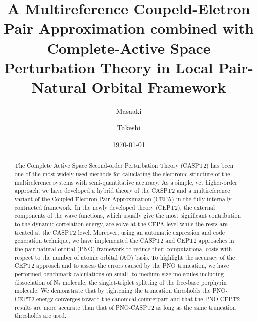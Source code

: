 \documentclass[aip,jcp,amsmath]{revtex4-1}
\begin{document}
\title{\color{blue}
  A Multireference Coupeld-Eletron Pair Approximation combined with Complete-Active Space Perturbation Theory in Local Pair-Natural Orbital Framework}
\date{\today}
\author{Masaaki }

\author{Takeshi }

\begin{abstract}  
  The Complete Active Space Second-order Perturbation Theory (CASPT2) has been one of the most widely used methods for caluclating the electronic structure of the multireference systems with semi-quantitative accuracy.
  As a simple, yet higher-order approach, we have developed a hybrid theory of the CASPT2 and a multireference variant of the Coupled-Electron Pair Approximation (CEPA) in the fully-internally contracted framework.
  In the newly developed theory (CEPT2), the external components of the wave functions, which usually give the most significant contribution to the dynamic correlation energy, are solve at the CEPA level while the rests are treated at the CASPT2 level.
  Moreover, using an automatic expression and code generation technique, we have implemented the CASPT2 and CEPT2 approaches in the pair-natural orbital (PNO) framework to reduce their computational costs with respect to the number of atomic orbital (AO) basis.
  To highlight the accuracy of the CEPT2 approach and to assess the errors caused by the PNO truncation, we have performed benchmark calculations on small- to medium-size molecules including dissociation of N${}_2$ molecule, the singlet-triplet splitting of the free-base porphyrin molecule.
  We demonstrate that by tightening the truncation thresholds the PNO-CEPT2 energy converges toward the canonical counterpart and that the PNO-CEPT2 results are more accurate than that of PNO-CASPT2 as long as the same truncation thresholds are used.
  
\end{abstract}

\maketitle
\end{document}
